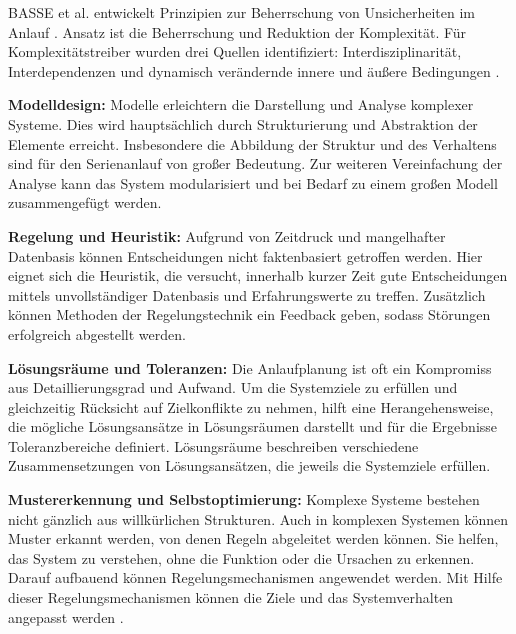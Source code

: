 BASSE et al. entwickelt Prinzipien zur Beherrschung von Unsicherheiten im Anlauf \autocite{Basse2014a}. Ansatz ist die Beherrschung und Reduktion der Komplexität. Für Komplexitätstreiber wurden drei Quellen identifiziert: Interdisziplinarität, Interdependenzen und dynamisch verändernde innere und äußere Bedingungen \autocite{Basse2014a, Gartzen2012, Schuh2008}. 

\textbf{Modelldesign:} Modelle erleichtern die Darstellung und Analyse komplexer Systeme. Dies wird hauptsächlich durch Strukturierung und Abstraktion der Elemente erreicht. 
Insbesondere die Abbildung der Struktur und des Verhaltens sind für den Serienanlauf von großer Bedeutung. Zur weiteren Vereinfachung der Analyse kann das System modularisiert und bei Bedarf zu einem großen Modell zusammengefügt werden. 

\textbf{Regelung und Heuristik:} Aufgrund von Zeitdruck und mangelhafter Datenbasis können Entscheidungen nicht faktenbasiert getroffen werden. Hier eignet sich die Heuristik, die versucht, innerhalb kurzer Zeit gute Entscheidungen mittels unvollständiger Datenbasis und Erfahrungswerte zu treffen. Zusätzlich können Methoden der Regelungstechnik ein Feedback geben, sodass Störungen erfolgreich abgestellt werden.

\textbf{Lösungsräume und Toleranzen:}
Die Anlaufplanung ist oft ein Kompromiss aus Detaillierungsgrad und Aufwand. Um die Systemziele zu erfüllen und gleichzeitig Rücksicht auf Zielkonflikte zu nehmen, hilft eine Herangehensweise, die mögliche Lösungsansätze in Lösungsräumen darstellt und für die Ergebnisse Toleranzbereiche definiert. Lösungsräume beschreiben verschiedene Zusammensetzungen von Lösungsansätzen, die jeweils die Systemziele erfüllen. 

\textbf{Mustererkennung und Selbstoptimierung:}
Komplexe Systeme bestehen nicht gänzlich aus willkürlichen Strukturen. Auch in komplexen Systemen können Muster erkannt werden, von denen Regeln abgeleitet werden können. Sie helfen, das System zu verstehen, ohne die Funktion oder die Ursachen zu erkennen. Darauf aufbauend können Regelungsmechanismen angewendet werden. Mit Hilfe dieser Regelungsmechanismen können die Ziele und das Systemverhalten angepasst werden \autocite{Frank2009}. 

